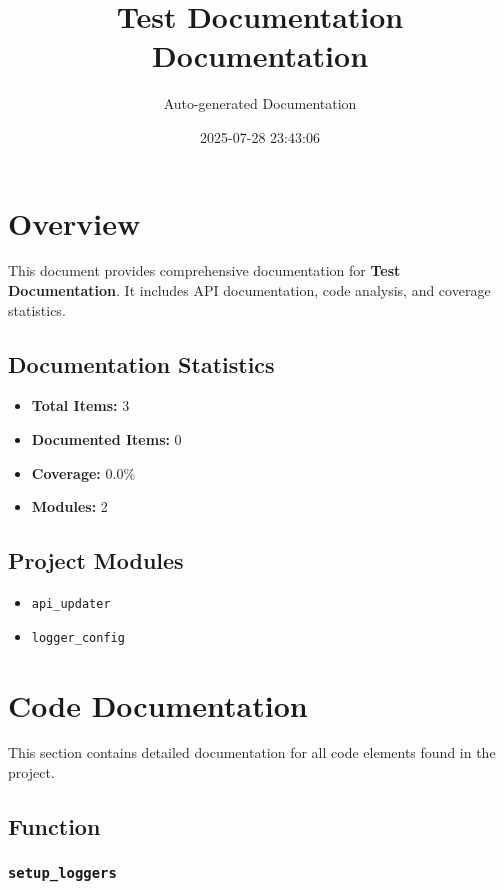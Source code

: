 \documentclass[11pt,a4paper]{article}
\title{Test Documentation\\Documentation}
\author{Auto-generated Documentation}
\date{2025-07-28 23:43:06}
\begin{document}
\maketitle
\thispagestyle{empty}

\newpage
\tableofcontents
\newpage

\section{Overview}

This document provides comprehensive documentation for \textbf{Test Documentation}. It includes API documentation, code analysis, and coverage statistics.

\subsection{Documentation Statistics}

\begin{itemize}
    \item \textbf{Total Items:} 3
    \item \textbf{Documented Items:} 0
    \item \textbf{Coverage:} 0.0\%
    \item \textbf{Modules:} 2
\end{itemize}

\subsection{Project Modules}

\begin{itemize}
    \item \texttt{api\_updater}
    \item \texttt{logger\_config}
\end{itemize}

\section{Code Documentation}

This section contains detailed documentation for all code elements found in the project.

\subsection{Function}

\subsubsection{\texttt{setup\_loggers}}
\end{document}
